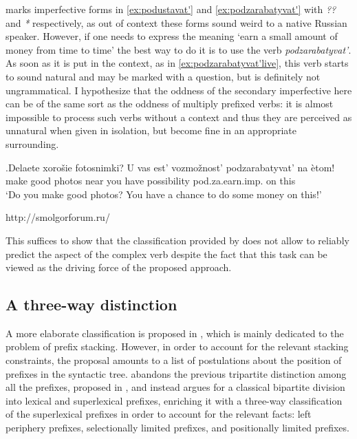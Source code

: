 \cite{Kagan:book} marks imperfective forms in \ref{ex:podustavat'} and \ref{ex:podzarabatyvat'} with \textit{??} and \textit{*} respectively, as out of context these forms sound weird to a native Russian speaker. However, if one needs to express the meaning `earn a small amount of money from time to time' the best way to do it is to use the verb \textit{podzarabatyvat'}. As soon as it is put in the context, as in \ref{ex:podzarabatyvat'live}, this verb starts to sound natural and may be marked with a question, but is definitely not ungrammatical. I hypothesize that the oddness of the secondary imperfective here can be of the same sort as the oddness of multiply prefixed verbs: it is almost impossible to process such verbs without a context and thus they are perceived as unnatural when given in isolation, but become fine in an appropriate surrounding.

\exg.\label{ex:podzarabatyvat'live}Delaete xoro\v{s}ie fotosnimki? U vas est' vozmo\v{z}nost' podzarabatyvat' na \`{e}tom!\\
make good photos near you have possibility pod.za.earn.imp. on this\\
\vspace{0.5em}
`Do you make good photos? You have a chance to do some money on this!'\\
\begin{flushright}
\vspace{-1em}
http://smolgorforum.ru/
\end{flushright}

This suffices to show that the classification provided by \citet{Tatevosov:07} does not allow to reliably predict the aspect of the complex verb despite the fact that this task can be viewed as the driving force of the proposed approach. 

\subsection{A three-way distinction}\label{section:Tat09}
A more elaborate classification is proposed in \citealt{Tatevosov:09}, which is mainly dedicated to the problem of prefix stacking. However, in order to account for the relevant stacking constraints, the proposal amounts to a list of postulations about the position of prefixes in the syntactic tree. \citet{Tatevosov:09} abandons the previous tripartite distinction among all the prefixes, proposed in \citet{Tatevosov:07}, and instead argues for a classical bipartite division into lexical and superlexical prefixes, enriching it with a three-way classification of the superlexical prefixes in order to account for the relevant facts: left periphery prefixes, selectionally limited prefixes, and positionally limited prefixes.

